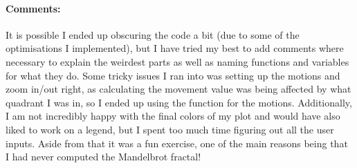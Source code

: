 \paragraph{Comments:}
It is possible I ended up obscuring the code a bit (due to some of the optimisations I implemented), but I have tried my best to add comments where necessary to explain the weirdest parts as well as naming functions and variables for what they do.
Some tricky issues I ran into was setting up the motions and zoom in/out right, as calculating the movement value was being affected by what quadrant I was in, so I ended up using the  function for the motions.
Additionally, I am not incredibly happy with the final colors of my plot and would have also liked to work on a legend, but I spent too much time figuring out all the user inputs.
Aside from that it was a fun exercise, one of the main reasons being that I had never computed the Mandelbrot fractal!
